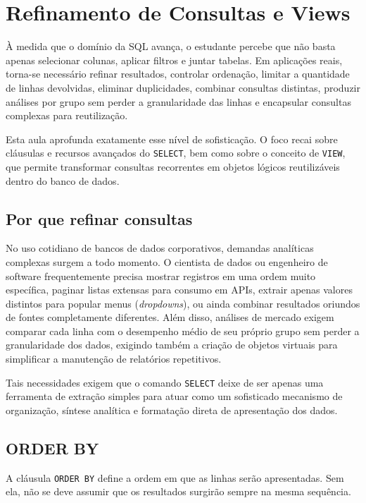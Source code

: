\chapter{Refinamento de Consultas e Views}
\label{cap:refinamento_consultas_views}

À medida que o domínio da SQL avança, o estudante percebe que não basta apenas selecionar colunas, aplicar filtros e juntar tabelas. Em aplicações reais, torna-se necessário refinar resultados, controlar ordenação, limitar a quantidade de linhas devolvidas, eliminar duplicidades, combinar consultas distintas, produzir análises por grupo sem perder a granularidade das linhas e encapsular consultas complexas para reutilização.

Esta aula aprofunda exatamente esse nível de sofisticação. O foco recai sobre cláusulas e recursos avançados do \texttt{SELECT}, bem como sobre o conceito de \texttt{VIEW}, que permite transformar consultas recorrentes em objetos lógicos reutilizáveis dentro do banco de dados.

\section{Por que refinar consultas}

No uso cotidiano de bancos de dados corporativos, demandas analíticas complexas surgem a todo momento. O cientista de dados ou engenheiro de software frequentemente precisa mostrar registros em uma ordem muito específica, paginar listas extensas para consumo em APIs, extrair apenas valores distintos para popular menus (\textit{dropdowns}), ou ainda combinar resultados oriundos de fontes completamente diferentes. Além disso, análises de mercado exigem comparar cada linha com o desempenho médio de seu próprio grupo sem perder a granularidade dos dados, exigindo também a criação de objetos virtuais para simplificar a manutenção de relatórios repetitivos.

Tais necessidades exigem que o comando \texttt{SELECT} deixe de ser apenas uma ferramenta de extração simples para atuar como um sofisticado mecanismo de organização, síntese analítica e formatação direta de apresentação dos dados.

\section{ORDER BY}

A cláusula \texttt{ORDER BY} define a ordem em que as linhas serão apresentadas. Sem ela, não se deve assumir que os resultados surgirão sempre na mesma sequência.

